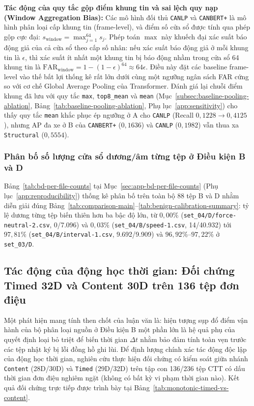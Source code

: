 \documentclass[12pt, a4paper, reqno, oneside]{book}
\DeclareRobustCommand{\code}[1]{\nolinkurl{#1}}
\begin{document}
\noindent\textbf{Tác động của quy tắc gộp điểm khung tin và sai lệch quy nạp (Window Aggregation Bias):} Các mô hình đối thủ \code{CANLP} và \code{CANBERT+} là mô hình phân loại cấp khung tin (frame-level), và điểm số cửa sổ được tính qua phép gộp cực đại: $s_{\text{window}} = \max_{j=1}^{64} s_j$. Phép toán $\max$ này khuếch đại xác suất báo động giả của cả cửa sổ theo cấp số nhân: nếu xác suất báo động giả ở mỗi khung tin là $\epsilon$, thì xác suất ít nhất một khung tin bị báo động nhầm trong cửa sổ 64 khung tin là $\text{FAR}_{\text{window}} = 1 - (1 - \epsilon)^{64} \approx 64\epsilon$. Điều này đặt các baseline frame-level vào thế bất lợi thống kê rất lớn dưới cùng một ngưỡng ngân sách FAR cứng so với cơ chế Global Average Pooling của Transformer. Đánh giá lại chuỗi điểm khung đã lưu với quy tắc \code{max}, \code{top8\_mean} và \code{mean} (Mục~\ref{subsec:baseline-pooling-ablation}, Bảng~\ref{tab:baseline-pooling-ablation}, Phụ lục~\ref{app:sensitivity}) cho thấy quy tắc \code{mean} khắc phục ép ngưỡng ở A cho \code{CANLP} (Recall $0{,}1228 \to 0{,}4125$), nhưng AP đa xe ở B của \code{CANBERT+} ($0{,}1636$) và \code{CANLP} ($0{,}1982$) vẫn thua xa \code{Structural} ($0{,}5554$).

\subsubsection{Phân bố số lượng cửa sổ dương/âm từng tệp ở Điều kiện B và D}\label{subsec:bd-per-file-counts}
Bảng~\ref{tab:bd-per-file-counts} tại Mục~\ref{sec:app-bd-per-file-counts} (Phụ lục~\ref{app:reproducibility}) thống kê phân bố trên toàn bộ 88 tệp B và D nhằm diễn giải đúng Bảng~\ref{tab:comparison-main}--\ref{tab:benign-calibration-summary}: tỷ lệ dương từng tệp biến thiên hơn ba bậc độ lớn, từ $0{,}00\%$ (\code{set\_04/D/force-neutral-2.csv}, 0/7.096) và $0{,}03\%$ (\code{set\_04/B/speed-1.csv}, 14/40.932) tới $97{,}81\%$ (\code{set\_04/B/interval-1.csv}, 9.692/9.909) và $96{,}92\%\text{--}97{,}22\%$ ở \code{set\_03/D}.

\subsection{Tác động của động học thời gian: Đối chứng Timed 32D và Content 30D trên 136 tệp đơn điệu}\label{subsec:timed-vs-content}
Một phát hiện mang tính then chốt của luận văn là: hiện tượng sụp đổ điểm vận hành của bộ phân loại nguồn ở Điều kiện B một phần lớn là hệ quả phụ của quyết định loại bỏ triệt để biến thời gian $\Delta t$ nhằm bảo đảm tính toàn vẹn trước các tệp nhật ký bị lỗi đồng hồ ghi lùi. Để định lượng chính xác tác động độc lập của động học thời gian, nghiên cứu thực hiện đối chứng có kiểm soát giữa nhánh \code{Content} (28D/30D) và \code{Timed} (29D/32D) trên tập con 136/236 tệp CTT có dấu thời gian đơn điệu nghiêm ngặt (không có bất kỳ vi phạm thời gian nào). Kết quả đối chứng trực tiếp được trình bày tại Bảng~\ref{tab:monotonic-timed-vs-content}.
\end{document}
